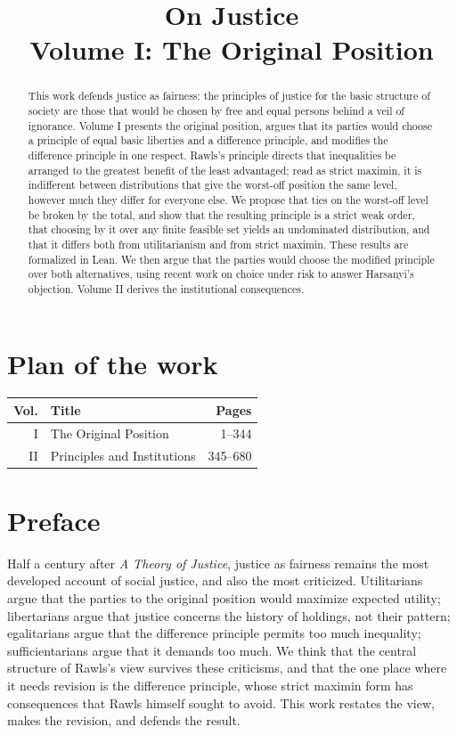 \documentclass{situationist-preprint}
\title{On Justice\\[0.4em]\large Volume I: The Original Position}
\begin{document}
\maketitle

\begin{abstract}
This work defends justice as fairness: the principles of justice for the basic structure of society are those that would be chosen by free and equal persons behind a veil of ignorance. Volume I presents the original position, argues that its parties would choose a principle of equal basic liberties and a difference principle, and modifies the difference principle in one respect. Rawls's principle directs that inequalities be arranged to the greatest benefit of the least advantaged; read as strict maximin, it is indifferent between distributions that give the worst-off position the same level, however much they differ for everyone else. We propose that ties on the worst-off level be broken by the total, and show that the resulting principle is a strict weak order, that choosing by it over any finite feasible set yields an undominated distribution, and that it differs both from utilitarianism and from strict maximin. These results are formalized in Lean. We then argue that the parties would choose the modified principle over both alternatives, using recent work on choice under risk to answer Harsanyi's objection. Volume II derives the institutional consequences.
\end{abstract}

\section*{Plan of the work}

\begin{center}\small
\begin{tabular}{@{}rlr@{}}
\toprule
Vol. & Title & Pages \\
\midrule
I & The Original Position & 1--344 \\
II & Principles and Institutions & 345--680 \\
\bottomrule
\end{tabular}
\end{center}

\section*{Preface}

Half a century after \emph{A Theory of Justice}, justice as fairness remains the most developed account of social justice, and also the most criticized. Utilitarians argue that the parties to the original position would maximize expected utility; libertarians argue that justice concerns the history of holdings, not their pattern; egalitarians argue that the difference principle permits too much inequality; sufficientarians argue that it demands too much. We think that the central structure of Rawls's view survives these criticisms, and that the one place where it needs revision is the difference principle, whose strict maximin form has consequences that Rawls himself sought to avoid. This work restates the view, makes the revision, and defends the result.
\end{document}
